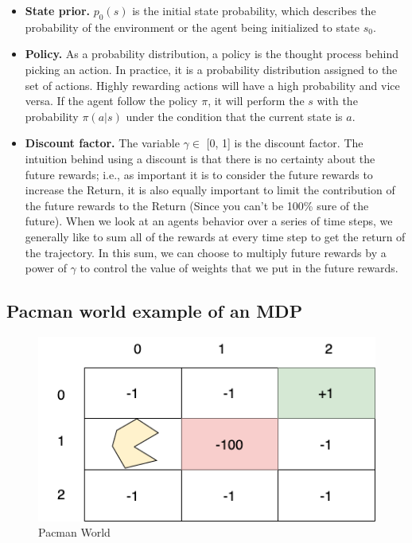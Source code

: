 \documentclass[11pt]{article}
\begin{document}
\begin{itemize}
    \item \textbf{State prior.} $p_0(s)$ is the initial state probability, which describes the probability of the environment or the agent being initialized to state $s_0$.

    \item \textbf{Policy.} As a probability distribution, a policy is the thought process behind picking an action. In practice, it is a probability distribution assigned to the set of actions. Highly rewarding actions will have a high probability and vice versa. If the agent follow the policy $\pi$, it will perform the $s$ with the probability $\pi (a|s)$ under the condition that the current state is $a$.

    \item \textbf{Discount factor.} The variable $\gamma \in$ [0, 1] is the discount factor. The intuition behind using a discount is that there is no certainty about the future rewards; i.e., as important it is to consider the future rewards to increase the Return, it is also equally important to limit the contribution of the future rewards to the Return (Since you can’t be 100\% sure of the future). When we look at an agents behavior over a series of time steps, we generally like to sum all of the rewards at every time step to get the return of the trajectory. In this sum, we can choose to multiply future rewards by a power of $\gamma$ to control the value of weights that we put in the future rewards.
\end{itemize}

\subsection{Pacman world example of an MDP}

\begin{figure}[H]
  \centering
  \includegraphics[width=0.75\linewidth]{pacman_new.png}
\caption{Pacman World}
\label{fig:test}
\end{figure}
\end{document}
